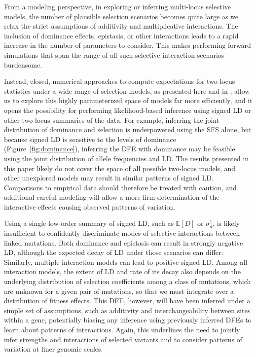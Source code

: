 \documentclass[]{article}
\newcommand{\E}{\mathbb{E}}
\begin{document}
From a modeling perspective, in exploring or inferring multi-locus selective
models, the number of plausible selection scenarios becomes quite large as we
relax the strict assumptions of additivity and multiplicative interactions.
The inclusion of dominance effects, epistasis, or other interactions leads to a
rapid increase in the number of parameters to consider. This makes performing
forward simulations that span the range of all such selective interaction
scenarios burdensome. 

Instead, closed, numerical approaches to compute expectations for two-locus
statistics under a wide range of selection models, as presented here and in
\citet{Friedlander2022-bs}, allow us to explore this highly parameterized space
of models far more efficiently, and it opens the possibility for performing
likelihood-based inference using signed LD or other two-locus summaries of the
data. For example, inferring the joint distribution of dominance and selection
is underpowered using the SFS alone, but because signed LD is sensitive to the
levels of dominance (Figure~\ref{fig:dominance}), inferring the DFE with
dominance may be feasible using the joint distribution of allele frequencies
and LD. The results presented in this paper likely do not cover the space of
all possible two-locus models, and other unexplored models may result in
similar patterns of signed LD. Comparisons to empirical data should therefore
be treated with caution, and additional careful modeling will allow a more firm
determination of the interactive effects causing observed patterns of
variation.

Using a single low-order summary of signed LD, such as \(\E[D]\) or
\(\sigma_d^1\), is likely insufficient to confidently discriminate modes of
selective interactions between linked mutations. Both dominance and epistasis
can result in strongly negative LD, although the expected decay of LD under
those scenarios can differ. Similarly, multiple interaction models can lead to
positive signed LD. Among all interaction models, the extent of LD and rate of
its decay also depends on the underlying distribution of selection coefficients
among a class of mutations, which are unknown for a given pair of mutations, so
that we must integrate over a distribution of fitness effects. This DFE,
however, will have been inferred under a simple set of assumptions, such as
additivity and interchangeability between sites within a gene, potentially
biasing any inference using previously inferred DFEs to learn about patterns of
interactions. Again, this underlines the need to jointly infer strengths and
interactions of selected variants and to consider patterns of variation at
finer genomic scales.
\end{document}
